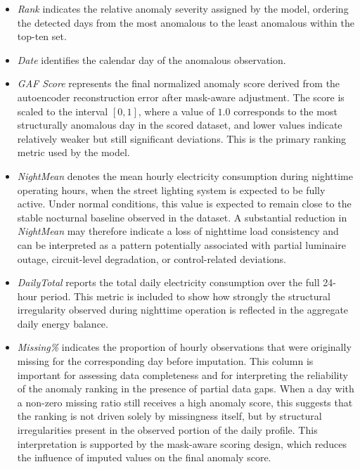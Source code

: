 \documentclass{article}
\begin{document}
\begin{itemize}
    \item \textit{Rank} indicates the relative anomaly severity assigned by the model, ordering the detected days from the most anomalous to the least anomalous within the top-ten set. 

    \item \textit{Date}  identifies the calendar day of the anomalous observation.

    \item \textit{GAF Score} represents the final normalized anomaly score derived from the autoencoder reconstruction error after mask-aware adjustment. The score is scaled to the interval $[0,1]$, where a value of $1.0$ corresponds to the most structurally anomalous day in the scored dataset, and lower values indicate relatively weaker but still significant deviations. This is the primary ranking metric used by the model.

    \item \textit{NightMean} denotes the mean hourly electricity consumption during nighttime operating hours, when the street lighting system is expected to be fully active. Under normal conditions, this value is expected to remain close to the stable nocturnal baseline observed in the dataset. A substantial reduction in \textit{NightMean} may therefore indicate a loss of nighttime load consistency and can be interpreted as a pattern potentially associated with partial luminaire outage, circuit-level degradation, or control-related deviations.

    \item \textit{DailyTotal} reports the total daily electricity consumption over the full 24-hour period. This metric is included to show how strongly the structural irregularity observed during nighttime operation is reflected in the aggregate daily energy balance.

    \item \textit{Missing\%} indicates the proportion of hourly observations that were originally missing for the corresponding day before imputation. This column is important for assessing data completeness and for interpreting the reliability of the anomaly ranking in the presence of partial data gaps. When a day with a non-zero missing ratio still receives a high anomaly score, this suggests that the ranking is not driven solely by missingness itself, but by structural irregularities present in the observed portion of the daily profile. This interpretation is supported by the mask-aware scoring design, which reduces the influence of imputed values on the final anomaly score.
\end{itemize}
\end{document}
